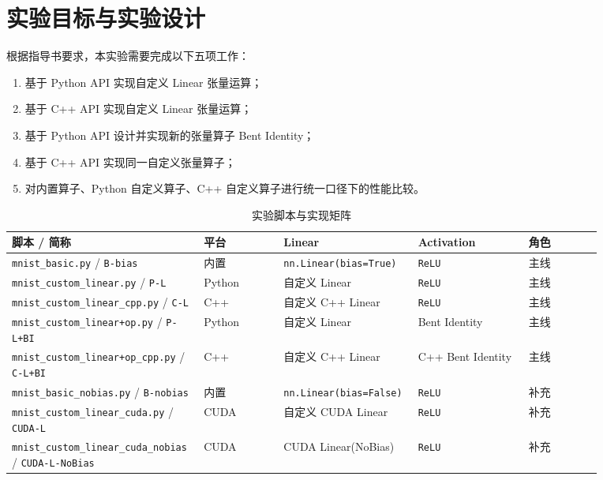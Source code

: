 \documentclass{article}
\begin{document}
\section{实验目标与实验设计}
根据指导书要求，本实验需要完成以下五项工作：
\begin{enumerate}
    \item 基于 Python API 实现自定义 Linear 张量运算；
    \item 基于 C++ API 实现自定义 Linear 张量运算；
    \item 基于 Python API 设计并实现新的张量算子 Bent Identity；
    \item 基于 C++ API 实现同一自定义张量算子；
    \item 对内置算子、Python 自定义算子、C++ 自定义算子进行统一口径下的性能比较。
\end{enumerate}

\begin{table}[H]
\centering
\caption{实验脚本与实现矩阵}
\label{tab:script_matrix}
\begin{tabular}{p{0.24\linewidth} p{0.13\linewidth} p{0.20\linewidth} p{0.18\linewidth} p{0.12\linewidth}}
\toprule
脚本 / 简称 & 平台 & Linear & Activation & 角色 \\
\midrule
\texttt{mnist\_basic.py} / \texttt{B-bias} & 内置 & \texttt{nn.Linear(bias=True)} & \texttt{ReLU} & 主线 \\
\texttt{mnist\_custom\_linear.py} / \texttt{P-L} & Python & 自定义 Linear & \texttt{ReLU} & 主线 \\
\texttt{mnist\_custom\_linear\_cpp.py} / \texttt{C-L} & C++ & 自定义 C++ Linear & \texttt{ReLU} & 主线 \\
\texttt{mnist\_custom\_linear+op.py} / \texttt{P-L+BI} & Python & 自定义 Linear & Bent Identity & 主线 \\
\texttt{mnist\_custom\_linear+op\_cpp.py} / \texttt{C-L+BI} & C++ & 自定义 C++ Linear & C++ Bent Identity & 主线 \\
\texttt{mnist\_basic\_nobias.py} / \texttt{B-nobias} & 内置 & \texttt{nn.Linear(bias=False)} & \texttt{ReLU} & 补充 \\
\texttt{mnist\_custom\_linear\_cuda.py} / \texttt{CUDA-L} & CUDA & 自定义 CUDA Linear & \texttt{ReLU} & 补充 \\
\texttt{mnist\_custom\_linear\_cuda\_nobias} / \texttt{CUDA-L-NoBias} & CUDA & CUDA Linear(NoBias) & \texttt{ReLU} & 补充 \\
\bottomrule
\end{tabular}
\end{table}
\end{document}
